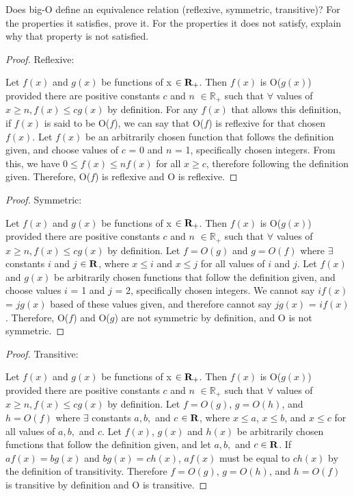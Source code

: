 \documentclass{article}
\begin{document}
\clearpage
\header
\item[]Does big-O define an equivalence relation (reflexive, symmetric, transitive)?
For the properties it satisfies, prove it. For the properties it does not satisfy, explain why that property is not satisfied.
\item[]
\begin{proof}
    \caption{Reflexive:}
        \item[]Let $f(x)$ and $g(x)$ be functions of x $\in \mathbf{R}_+$. Then $f(x)$ is O($g(x)$) provided there are positive constants $c$ and $n$ $\in \mathbb R_+$ such that $	\forall$ values of $x \geq n, f(x) \leq cg(x)$ by definition. For any $f(x)$ that allows this definition, if $f(x)$ is said to be O($f$), we can say that O($f$) is reflexive for that chosen $f(x)$. Let $f(x)$ be an arbitrarily chosen function that follows the definition given, and choose values of $c$ = 0 and $n$ = 1, specifically chosen integers. From this, we have $0 \leq f(x) \leq nf(x)$ for all $x \geq c$, therefore following the definition given. Therefore, O($f$) is reflexive and O is reflexive.
\end{proof}

\begin{proof}
    \caption{Symmetric:}
        \item[]Let $f(x)$ and $g(x)$ be functions of x $\in \mathbf{R}_+$. Then $f(x)$ is O($g(x)$) provided there are positive constants $c$ and $n$ $\in \mathbb R_+$ such that $	\forall$ values of $x \geq n, f(x) \leq cg(x)$ by definition. Let $f = O(g)$ and $g = O(f)$ where $\exists$ constants $i$ and $j$ $\in \mathbf{R}$, where $x \leq i$ and $x \leq j$ for all values of $i$ and $j$. Let $f(x)$ and $g(x)$ be arbitrarily chosen functions that follow the definition given, and choose values $i$ = 1 and $j$ = 2, specifically chosen integers. We cannot say $if(x)$ = $jg(x)$ based of these values given, and therefore cannot say $jg(x)$ = $if(x)$. Therefore, O($f$) and O($g$) are not symmetric by definition, and O is not symmetric. 
\end{proof}

\begin{proof}
    \caption{Transitive:}
        \item[]Let $f(x)$ and $g(x)$ be functions of x $\in \mathbf{R}_+$. Then $f(x)$ is O($g(x)$) provided there are positive constants $c$ and $n$ $\in \mathbb R_+$ such that $	\forall$ values of $x \geq n, f(x) \leq cg(x)$ by definition. Let $f = O(g)$, $g = O(h)$, and $h = O(f)$ where $\exists$ constants $a, b,$ and $c$ $\in \mathbf{R}$, where $x \leq a$, $x \leq b$, and $x \leq c$ for all values of $a,b,$ and $c$. Let $f(x)$, $g(x)$ and $h(x)$ be arbitrarily chosen functions that follow the definition given, and let $a,b,$ and $c \in \mathbf{R}$. If $af(x) = bg(x)$ and $bg(x) = ch(x)$, $af(x)$ must be equal to $ch(x)$ by the definition of transitivity. Therefore $f = O(g)$, $g = O(h)$, and $h = O(f)$ is transitive by definition and O is transitive.
\end{proof}
\end{document}
